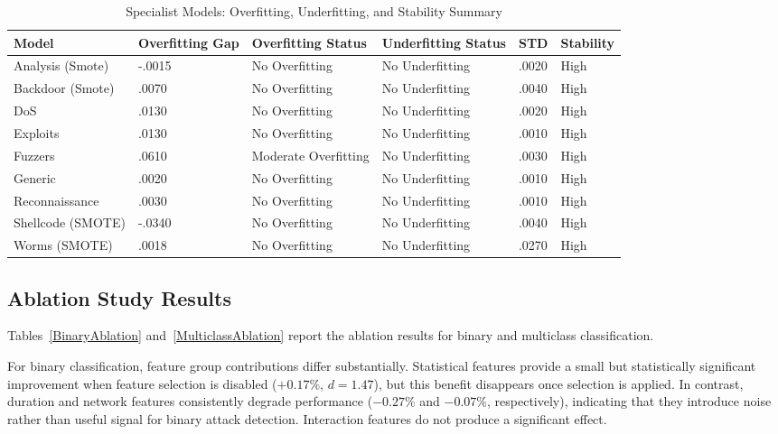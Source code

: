 \documentclass[pdflatex,sn-mathphys-num]{sn-jnl}
\theoremstyle{thmstyleone}%
\theoremstyle{thmstyletwo}%
\theoremstyle{thmstylethree}%
\begin{document}
\begin{table}[htbp]
\centering
\small
\caption{Specialist Models: Overfitting, Underfitting, and Stability Summary}
\label{SpecialistStabality}
\renewcommand{\arraystretch}{1.0}
\setlength{\tabcolsep}{4pt}
\begin{tabular}{@{}p{2.7cm}p{2.2cm}p{2.7cm}p{2.8cm}p{1.3cm}p{1.8cm}@{}}
\toprule
\textbf{Model} 
& \textbf{Overfitting Gap} 
& \textbf{Overfitting Status}
& \textbf{Underfitting Status} 
& \textbf{STD} 
& \textbf{Stability} \\
\midrule

Analysis (Smote)  & -.0015 & No Overfitting       & No Underfitting & .0020 & High \\
Backdoor (Smote)  & .0070  & No Overfitting       & No Underfitting & .0040 & High \\
DoS               & .0130  & No Overfitting       & No Underfitting & .0020 & High \\
Exploits          & .0130  & No Overfitting       & No Underfitting & .0010 & High \\
Fuzzers           & .0610  & Moderate Overfitting & No Underfitting & .0030 & High \\
Generic           & .0020  & No Overfitting       & No Underfitting & .0010 & High \\
Reconnaissance    & .0030  & No Overfitting       & No Underfitting & .0010 & High \\
Shellcode (SMOTE) & -.0340 & No Overfitting       & No Underfitting & .0040 & High \\
Worms (SMOTE)     & .0018  & No Overfitting       & No Underfitting & .0270 & High \\

\bottomrule
\end{tabular}
\end{table}

\subsection{Ablation Study Results}

Tables~\ref{BinaryAblation} and~\ref{MulticlassAblation} report the ablation results for binary and multiclass classification.

For binary classification, feature group contributions differ substantially. Statistical features provide a small but statistically significant improvement when feature selection is disabled ($+0.17\%$, $d = 1.47$), but this benefit disappears once selection is applied. In contrast, duration and network features consistently degrade performance ($-0.27\%$ and $-0.07\%$, respectively), indicating that they introduce noise rather than useful signal for binary attack detection. Interaction features do not produce a significant effect.
\end{document}
